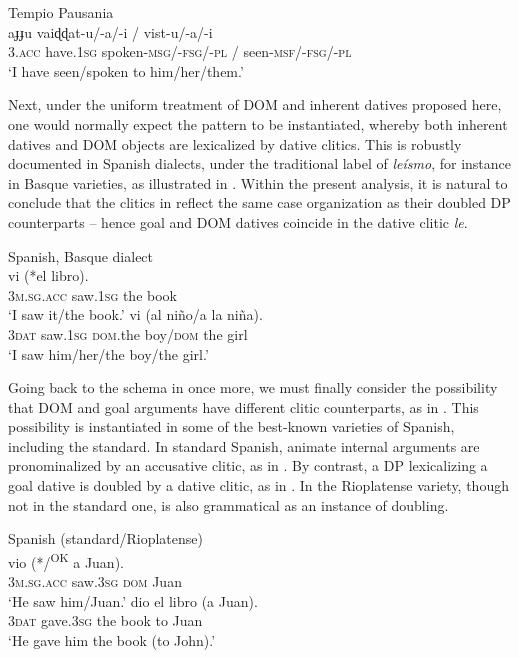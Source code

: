 \documentclass[output=paper,colorlinks,citecolor=brown,nonflat]{./langscibook}
\begin{document}
\ea%
    \label{ex:manzini:22}
    Tempio Pausania \citep{ManziniSavoia2005}\\
        {aɟɟu}     {vaiɖɖat-u/-a/-i}  /  {vist-u/-a/-i}\\
        \textsc{3.acc}  have.\textsc{1sg}   spoken-\textsc{msg/-fsg/-pl} / seen-\textsc{msf/-fsg/-pl}\\
    \glt ‘I have seen/spoken to him/her/them.’
\z


Next, under the uniform treatment of DOM and inherent datives proposed here, one would normally expect the pattern  to be instantiated, whereby both inherent datives and DOM objects are lexicalized by dative clitics. This is robustly documented in Spanish dialects, under the traditional label of \textit{leísmo}, for instance in Basque varieties, as illustrated in . Within the present analysis, it is natural to conclude that the clitics in  reflect the same case organization as their doubled DP counterparts – hence goal and DOM datives coincide in the dative clitic \textit{le}.

\ea%
    \label{ex:manzini:23}
    Spanish, Basque dialect \citep{OrmazabalRomero2013Probus}\\
    \ea\label{ex:manzini:23a}      {vi}     (*el libro).\\
        \textsc{3m.sg.acc}  saw.\textsc{1sg}  {\db}the book\\
    \glt ‘I saw it/the book.’
    \ex\label{ex:manzini:23b}    {vi}     (al niño/a la niña).\\
        \textsc{3dat}  saw.\textsc{1sg}  \textsc{dom}.the boy/\textsc{dom} the girl\\
    \glt ‘I saw him/her/the boy/the girl.’
    \z
\z

Going back to the schema in  once more, we must finally consider the possibility that DOM and goal arguments have different clitic counterparts, as in . This possibility is instantiated in some of the best-known varieties of Spanish, including the standard. In standard Spanish, animate internal arguments are pronominalized by an accusative clitic, as in . By contrast, a DP lexicalizing a goal dative is doubled by a dative clitic, as in . In the Rioplatense variety, though not in the standard one,  is also grammatical as an instance of doubling.

\ea%
    \label{ex:manzini:24}
    Spanish (standard/Rioplatense)\\
    \ea\label{ex:manzini:24a}
         {vio}    (*/\textsuperscript{OK} {a} Juan).\\
        \textsc{3m.sg.acc}  saw.\textsc{3sg}  \textsc{dom} Juan\\
    \glt ‘He saw him/Juan.’
    \ex\label{ex:manzini:24b}
       {dio}     {el} {libro}   (a Juan).\\
        \textsc{3dat}   gave.\textsc{3sg}  the book   to Juan\\
    \glt ‘He gave him the book (to John).’
    \z
\z
\end{document}
